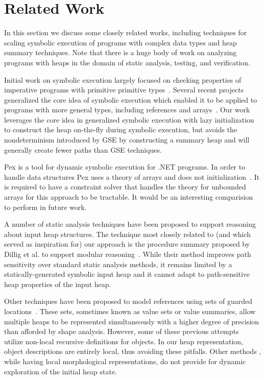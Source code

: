 \section{Related Work}
\label{related}

In this section we discuss some closely related works, including
techniques for scaling symbolic execution of programs with complex
data types and heap summary techniques. Note that there is a huge body
of work on analyzing programs with heaps in the domain of static
analysis, testing, and verification.

Initial work on symbolic execution largely focused on checking
properties of imperative programs with primitive primitive
types~\cite{Clarke:76,King:76}. Several recent projects generalized
the core idea of symbolic execution which enabled it to be applied to
programs with more general types, including references and
arrays~\cite{GSE03,Godefroid:PLDI05,Sen:FSE05,CadarEngler05EXE,KiasanKunit}.
Our work leverages the core idea in generalized symbolic execution
with lazy initialization to construct the heap on-the-fly during
symbolic execution, but avoids the nondeterminism introduced by GSE by
constructing a summary heap and will generally create fewer paths than
GSE techniques.

Pex is a tool for dynamic symbolic execution for .NET programs. In
order to handle data structures Pex uses a theory of arrays and does
not initialization~\cite{Tillmann:2008}.  It is required to have a
constraint solver that handles the theory for unbounded arrays for
this approach to be tractable. It would be an interesting comparision
to perform in future work.

A number of static analysis techniques have been proposed to support
reasoning about input heap structures. The technique most closely
related to (and which served as inspiration for) our approach is the
procedure summary proposed by Dillig et al. to support modular
reasoning~\cite{Dillig:2011}.  While their method improves path
sensitivity over standard static analysis methods, it remains limited
by a statically-generated symbolic input heap and it cannot adapt to
path-sensitive heap properties of the input heap.

Other techniques have been proposed to model references using sets of
guarded
locations~\cite{Xie:2005,Cherem:2007,Dillig:2011,Sen:2014}. These
sets, sometimes known as value sets or value summaries, allow multiple
heaps to be represented simultaneously with a higher degree of
precision than afforded by shape analysis. However, some of these
previous attempts~\cite{Xie:2005,Cherem:2007} utilize non-local
recursive definitions for objects.  In our heap representation, object descriptions are
entirely local, thus avoiding these pitfalls. Other methods
\cite{Dillig:2011,Sen:2014}, while having local morphological
representations, do not provide for dynamic exploration of the initial
heap state.


